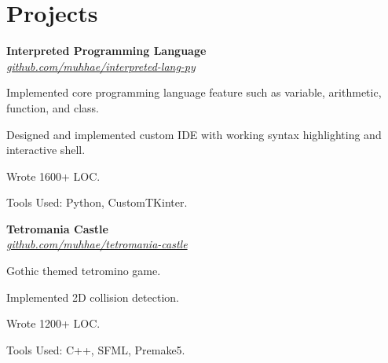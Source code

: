 \section{Projects}
    \begin{twocolentry}{
    }
    \textbf{Interpreted Programming Language}\\
    \textit{\href{https://github.com/muhhae/interpreted-lang-py}{github.com/muhhae/interpreted-lang-py}}
    \end{twocolentry}

    \vspace{0.10 cm}
    \begin{onecolentry}
        \begin{highlights}
            \item Implemented core programming language feature such as variable, arithmetic, function,
                and class.
            \item Designed and implemented custom IDE with working syntax highlighting and interactive shell.
            \item Wrote 1600+ LOC.
            \item Tools Used: Python, CustomTKinter.
        \end{highlights}
    \end{onecolentry}

    \vspace{0.2 cm}

    \begin{twocolentry}{
    }
    \textbf{Tetromania Castle}\\
    \textit{\href{https://github.com/muhhae/tetromania-castle}{github.com/muhhae/tetromania-castle}}
    \end{twocolentry}

    \vspace{0.10 cm}
    \begin{onecolentry}
        \begin{highlights}
            \item Gothic themed tetromino game.
            \item Implemented 2D collision detection.
            \item Wrote 1200+ LOC.
            \item Tools Used: C++, SFML, Premake5.
        \end{highlights}
    \end{onecolentry}

    \vspace{0.2 cm}


